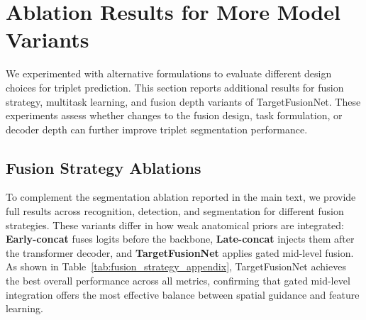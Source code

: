 \section{Ablation Results for More Model Variants}
We experimented with alternative formulations to evaluate different design choices for triplet prediction. 
This section reports additional results for fusion strategy, multitask learning, and fusion depth variants of TargetFusionNet.
These experiments assess whether changes to the fusion design, task formulation, or decoder depth can further improve triplet segmentation performance.


\subsection{Fusion Strategy Ablations}
To complement the segmentation ablation reported in the main text, we provide full results across recognition, detection, and segmentation for different fusion strategies. 
These variants differ in how weak anatomical priors are integrated: \textbf{Early-concat} fuses logits before the backbone, \textbf{Late-concat} injects them after the transformer decoder, and \textbf{TargetFusionNet} applies gated mid-level fusion. 
As shown in Table~\ref{tab:fusion_strategy_appendix}, TargetFusionNet achieves the best overall performance across all metrics, confirming that gated mid-level integration offers the most effective balance between spatial guidance and feature learning.



